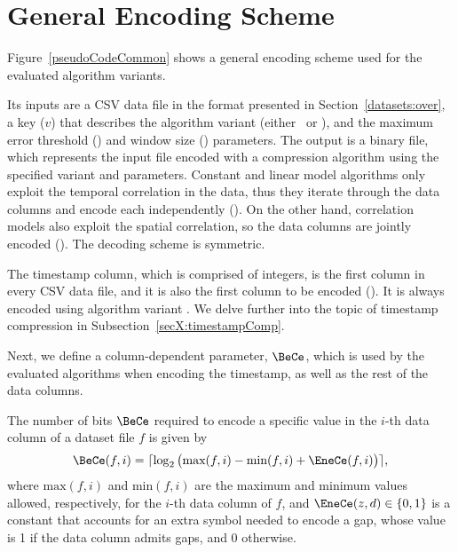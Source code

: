 

\vspace{-15pt}
\section{General Encoding Scheme}
\label{algo:details}


Figure~\ref{pseudoCodeCommon} shows a general encoding scheme used for the evaluated algorithm variants. 





\clearpage


Its inputs are a CSV data file in the format presented in Section~\ref{datasets:over}, a key ($v$) that describes the algorithm variant (either \maskalgo\ or \NOmaskalgo), and the maximum error threshold (\maxerror) and window size (\win) parameters. The output is a binary file, which represents the input file encoded with a compression algorithm using the specified variant and parameters. Constant and linear model algorithms only exploit the temporal correlation in the data, thus they iterate through the data columns and encode each independently (). On the other hand, correlation models also exploit the spatial correlation, so the data columns are jointly encoded (). The decoding scheme is symmetric.


The timestamp column, which is comprised of integers, is the first column in every CSV data file, and it is also the first column to be encoded (). It is always encoded using algorithm variant . We delve further into the topic of timestamp compression in Subsection~\ref{secX:timestampComp}. 


Next, we define a column-dependent parameter, $\BeCe$, which is used by the evaluated algorithms when encoding the timestamp, as well as the rest of the data columns.


\begin{defcion}
The number of bits $\BeCe$ required to encode a specific value in the $i$-th data column of a dataset file $f$ is given by
\vspace{-5pt}
\begin{equation}
\label{eq:bece}
\BeCe(f, i) = \lceil{ \log_2 \big( \text{max}(f, i) - \text{min}(f, i) + \EneCe(f, i) \big) } \rceil,
\end{equation}
where $\text{max}(f, i)$ and $\text{min}(f, i)$ are the maximum and minimum values allowed, respectively, for the $i$-th data column of $f$, and $\EneCe(z, d)\in \{0,1\}$ is a constant that accounts for an extra symbol needed to encode a gap, whose value is 1 if the data column admits gaps, and 0 otherwise.
\end{defcion}


